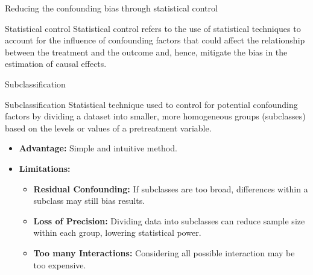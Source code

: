 \documentclass[aspectratio=169]{beamer}
\begin{document}
\begin{frame}{Reducing the confounding bias through statistical control}

    \begin{coolblock}{Statistical control}
        Statistical control refers to the use of statistical techniques to account for the influence of confounding factors that could affect the relationship between the treatment and the outcome and, hence, mitigate the bias in the estimation of causal effects.  
    \end{coolblock}
    
\end{frame}

\begin{frame}{Subclassification}


    \begin{coolblock}{Subclassification}
        Statistical technique used to control for potential confounding factors by dividing a dataset into smaller, more homogeneous groups (subclasses) based on the levels or values of a pretreatment variable.
    \end{coolblock}

    \begin{itemize}
        \item \textbf{Advantage:} Simple and intuitive method.
        \item \textbf{Limitations:} 
        \begin{itemize}
            \item[$\bullet$] \textbf{Residual Confounding:} If subclasses are too broad, differences within a subclass may still bias results.
            \item[$\bullet$] \textbf{Loss of Precision:} Dividing data into subclasses can reduce sample size within each group, lowering statistical power.
            \item[$\bullet$] \textbf{Too many Interactions:} Considering all possible interaction may be too expensive.
        \end{itemize} 
    \end{itemize}
    
\end{frame}
\end{document}
